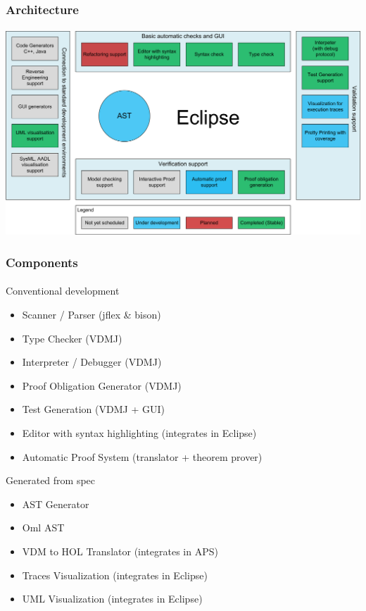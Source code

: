 \documentclass[slidestop,uncompress,mathserif,notes]{beamer}
\begin{document}
\begin{frame}[c]
  \frametitle{Architecture}
  \framesubtitle{}

  \begin{center}
    \includegraphics[width=\textwidth]{images/overture_arch.png}
  \end{center}
\end{frame}


\begin{frame}[c]
  \frametitle{Components}
  \framesubtitle{}

  \begin{block}{Conventional development}
	{\scriptsize \begin{itemize}
		\item Scanner / Parser (jflex \& bison)
		\item Type Checker (VDMJ)
		\item Interpreter / Debugger (VDMJ)
		\item Proof Obligation Generator (VDMJ)
		\item Test Generation (VDMJ + GUI)
		\item Editor with syntax highlighting (integrates in Eclipse)
		\item Automatic Proof System (translator + theorem prover)
	  \end{itemize}}
  \end{block}
%  
  \begin{block}{Generated from spec}
	{\scriptsize \begin{itemize}
	  	\item AST Generator
		\item Oml AST
		\item VDM to HOL Translator (integrates in APS)
		\item Traces Visualization (integrates in Eclipse)
		\item UML Visualization (integrates in Eclipse)
	  \end{itemize}}
  \end{block}

\end{frame}
\end{document}

